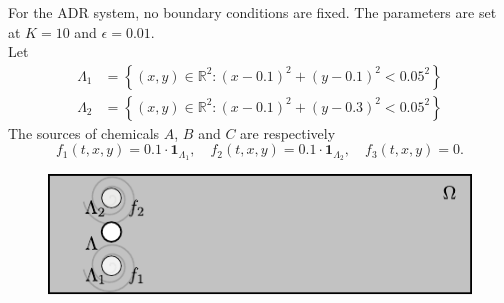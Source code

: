 \documentclass{beamer}
\theoremstyle{definition}
\theoremstyle{remark}
\theoremstyle{example}
\newif\ifinsection
\newif\ifinsubsection
\newcommand {\aframe}[1] {
  \begin{frame}
    \ifinsection\frametitle{\secname}\fi
    \ifinsubsection\framesubtitle{\subsecname}\fi
  #1
  \end{frame}
}
\begin{document}
\aframe{ For the ADR system, no boundary conditions are fixed. The parameters
  are set at $K=10$ and $\epsilon=0.01$.\\\vspace{0.5cm}\pause Let
  \begin{align*}
    \Lambda_1&=\left\{(x,y)\in\mathbb{R}^2:(x-0.1)^2+(y-0.1)^2<0.05^2\right\}\\
    \Lambda_2&=\left\{(x,y)\in\mathbb{R}^2:(x-0.1)^2+(y-0.3)^2<0.05^2\right\}
  \end{align*}
  The sources of chemicals $A$, $B$ and $C$ are respectively
  \[
    f_1(t,x,y)=0.1\cdot\pmb{1}_{\Lambda_1},\quad f_2(t,x,y)=0.1\cdot
    \pmb{1}_{\Lambda_2}, \quad f_3(t,x,y)=0.
  \]
  \begin{figure}
    \centering \includegraphics[scale=1]{figs/region2.pdf}
  \end{figure}
}
\end{document}
